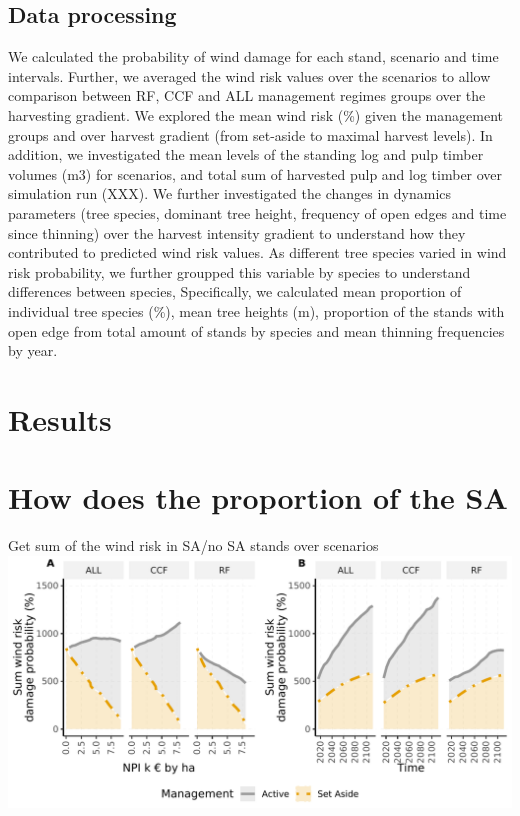 \documentclass[]{elsarticle} %
\makeatletter
\def\maxwidth{\ifdim\Gin@nat@width>\linewidth\linewidth
\else\Gin@nat@width\fi}
\let\Oldincludegraphics\includegraphics
\renewcommand{\includegraphics}[1]{\Oldincludegraphics[width=\maxwidth]{#1}}
\makeatother
\begin{document}
\hypertarget{data-processing}{%
\subsection{Data processing}\label{data-processing}}

We calculated the probability of wind damage for each stand, scenario and time intervals. Further, we averaged the wind risk values over the scenarios to allow comparison between RF, CCF and ALL management regimes groups over the harvesting gradient. We explored the mean wind risk (\%) given the management groups and over harvest gradient (from set-aside to maximal harvest levels). In addition, we investigated the mean levels of the standing log and pulp timber volumes (m3) for scenarios, and total sum of harvested pulp and log timber over simulation run (XXX). We further investigated the changes in dynamics parameters (tree species, dominant tree height, frequency of open edges and time since thinning) over the harvest intensity gradient to understand how they contributed to predicted wind risk values. As different tree species varied in wind risk probability, we further groupped this variable by species to understand differences between species, Specifically, we calculated mean proportion of individual tree species (\%), mean tree heights (m), proportion of the stands with open edge from total amount of stands by species and mean thinning frequencies by year.

\hypertarget{results}{%
\section{Results}\label{results}}

\hypertarget{how-does-the-proportion-of-the-sa}{%
\section{How does the proportion of the SA}\label{how-does-the-proportion-of-the-sa}}

Get sum of the wind risk in SA/no SA stands over scenarios
\includegraphics{test_manus3_files/figure-latex/unnamed-chunk-1-1.pdf}
\end{document}
